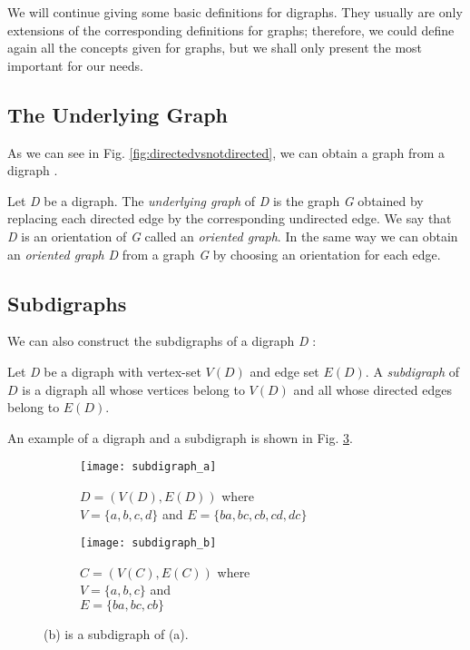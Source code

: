We will continue giving some basic definitions for digraphs. They usually are only extensions of the corresponding definitions for graphs; therefore, we could define again all the concepts given for graphs, but we shall only present the most important for our needs.\\

\subsection{The Underlying Graph}
As we can see in Fig. \ref{fig:directedvsnotdirected}, we can obtain a graph from a digraph \cite{wilsonwatkins}.

\begin{defn}
	Let \textit{D} be a digraph. The \textit{underlying graph} of \textit{D} is the graph \textit{G} obtained by replacing each directed edge by the corresponding undirected edge. We say that \textit{D} is an orientation of \textit{G} called an \textit{oriented graph}. In the same way we can obtain an \textit{oriented graph} \textit{D} from a graph \textit{G} by choosing an orientation for each edge.
\end{defn}

\subsection{Subdigraphs}
We can also construct the subdigraphs of a digraph \textit{D} \cite{wilsonwatkins}:

\begin{defn}
	Let \textit{D} be a digraph with vertex-set $V(D)$ and edge set $E(D)$. A \textit{subdigraph} of $D$ is a digraph all whose vertices belong to $V(D)$ and all whose directed edges belong to $E(D)$.
\end{defn}

An example of a digraph and a subdigraph is shown in Fig. \ref{fig:subdigraphs}.

\begin{figure}[h]
	\centering
	\begin{subfigure}[b]{0.4\textwidth}
		\centering
		\texttt{[image: subdigraph\_a]}
		\caption{$D=(V(D),E(D))$ where\\   $V=\{a,b,c,d\}$ and $E=\{ba,bc,cb,cd,dc\}$}
		\label{fig:subdigraph_a}
	\end{subfigure}
	\hfill
	\begin{subfigure}[b]{0.4\textwidth}
		\centering
		\texttt{[image: subdigraph\_b]}
		\caption{$C=(V(C),E(C))$ where\\   $V=\{a,b,c\}$ and\\$E=\{ba,bc,cb\}$}
		\label{fig:subdigraph_b}
	\end{subfigure}
	\caption[A subdigraph.]{(b) is a subdigraph of (a).}
	\label{fig:subdigraphs}
\end{figure}

